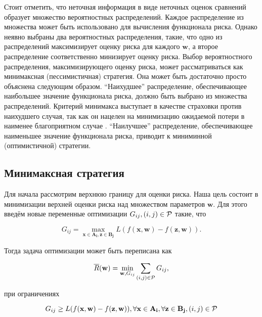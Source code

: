 \documentclass[12pt,a4paper,oneside]{article}
\begin{document}
\par
Стоит отметить, что неточная информация в виде неточных оценок сравнений образует множество вероятностных распределений. 
Каждое распределение из множества может быть использовано для вычисления функционала риска.
Однако неявно выбраны два вероятностных распределения, такие, что одно из распределений максимизирует оценку риска для каждого \(\mathbf{w}\), а второе распределение соответственно минизирует оценку риска. 
Выбор вероятностного распределения, максимизирующего оценку риска, может рассматриваться как минимаксная (пессимистичная) стратегия. 
Она может быть достаточно просто объяснена следующим образом. 
``Наихудшее'' распределение, обеспечивающее наибольшее значение функционала риска, должно быть выбрано из множества распределений. 
Критерий минимакса выступает в качестве страховки против наихудшего случая, так как он нацелен на минимизацию ожидаемой потери в наименее благоприятном случае . 
``Наилучшее'' распределение, обеспечивающее наименьшее значение функционала риска, приводит к миниминной (оптимистичной) стратегии.


\subsection{Минимаксная стратегия}

\par
Для начала рассмотрим верхнюю границу для оценки риска. 
Наша цель состоит в минимизации верхней оценки риска над множеством параметров \(\mathbf{w}\). 
Для этого введём новые переменные оптимизации \(G_{ij}, (i, j) \in \mathcal{P}\) такие, что

\[
G_{ij} = \underset{\mathbf{x} \in \mathbf{A_i}, \mathbf{z} \in \mathbf{B_j}}{\operatorname{max}} L (f (\mathbf{x}, \mathbf{w}) - f(\mathbf{z}, \mathbf{w})). 
\]

\par
Тогда задача оптимизации может быть переписана как

\[
\overline{R}(\mathbf{w}) = \underset{\mathbf{w}, G_{ij}}{\operatorname{min}} \sum \limits_{(i, j) \in \mathcal{P}} G_{ij},
\]

\par
при ограничениях

\[
G_{ij} \geq L (f(\mathbf{x}, \mathbf{w}) - f(\mathbf{z}, \mathbf{w})), \forall \mathbf{x} \in \mathbf{A_i}, \forall \mathbf{z} \in \mathbf{B_j}, (i, j) \in \mathcal{P}
\]
\end{document}
